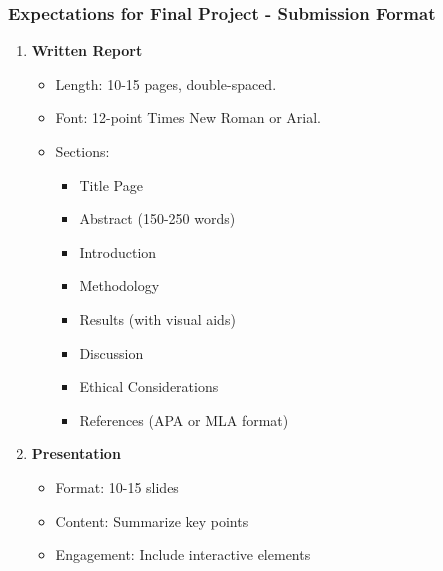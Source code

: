\documentclass[aspectratio=169]{beamer}
\begin{document}
\begin{frame}
    \frametitle{Expectations for Final Project - Submission Format}
    \begin{enumerate}
        \item \textbf{Written Report}
        \begin{itemize}
            \item Length: 10-15 pages, double-spaced.
            \item Font: 12-point Times New Roman or Arial.
            \item Sections:
            \begin{itemize}
                \item Title Page
                \item Abstract (150-250 words)
                \item Introduction
                \item Methodology
                \item Results (with visual aids)
                \item Discussion
                \item Ethical Considerations
                \item References (APA or MLA format)
            \end{itemize}
        \end{itemize}
        
        \item \textbf{Presentation}
        \begin{itemize}
            \item Format: 10-15 slides
            \item Content: Summarize key points
            \item Engagement: Include interactive elements
        \end{itemize}
    \end{enumerate}
\end{frame}
\end{document}
